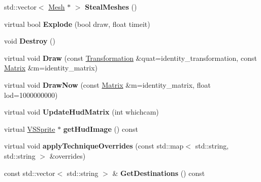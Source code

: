 \begin{DoxyCompactItemize}
\item 
std\+::vector$<$ \hyperlink{classMesh}{Mesh} $\ast$ $>$ {\bfseries Steal\+Meshes} ()\hypertarget{classUnit_a17b6cb21f170e5f752fa6f5b98232162}{}\label{classUnit_a17b6cb21f170e5f752fa6f5b98232162}

\item 
virtual bool {\bfseries Explode} (bool draw, float timeit)\hypertarget{classUnit_ab6575087839d746fb13b2ab46ff48c66}{}\label{classUnit_ab6575087839d746fb13b2ab46ff48c66}

\item 
void {\bfseries Destroy} ()\hypertarget{classUnit_a7ff138900be4b55a5cc5a39844f218a1}{}\label{classUnit_a7ff138900be4b55a5cc5a39844f218a1}

\item 
virtual void {\bfseries Draw} (const \hyperlink{structTransformation}{Transformation} \&quat=identity\+\_\+transformation, const \hyperlink{classMatrix}{Matrix} \&m=identity\+\_\+matrix)\hypertarget{classUnit_aaabd3667b707fb9c5e11bd8c03c663f6}{}\label{classUnit_aaabd3667b707fb9c5e11bd8c03c663f6}

\item 
virtual void {\bfseries Draw\+Now} (const \hyperlink{classMatrix}{Matrix} \&m=identity\+\_\+matrix, float lod=1000000000)\hypertarget{classUnit_ac152befb9343068c5b855b5d4fce5622}{}\label{classUnit_ac152befb9343068c5b855b5d4fce5622}

\item 
virtual void {\bfseries Update\+Hud\+Matrix} (int whichcam)\hypertarget{classUnit_af79ccb1caae4d2d289e9c7d8cf5c894e}{}\label{classUnit_af79ccb1caae4d2d289e9c7d8cf5c894e}

\item 
virtual \hyperlink{classVSSprite}{V\+S\+Sprite} $\ast$ {\bfseries get\+Hud\+Image} () const \hypertarget{classUnit_afb9c85129b61849fe8935d1fec06e7b3}{}\label{classUnit_afb9c85129b61849fe8935d1fec06e7b3}

\item 
virtual void {\bfseries apply\+Technique\+Overrides} (const std\+::map$<$ std\+::string, std\+::string $>$ \&overrides)\hypertarget{classUnit_abfe3d9a945404bb7c65a40f30728fa4f}{}\label{classUnit_abfe3d9a945404bb7c65a40f30728fa4f}

\item 
const std\+::vector$<$ std\+::string $>$ \& {\bfseries Get\+Destinations} () const \hypertarget{classUnit_a88843e20ca344097543557c18a10a22c}{}\label{classUnit_a88843e20ca344097543557c18a10a22c}


\end{DoxyCompactItemize}
